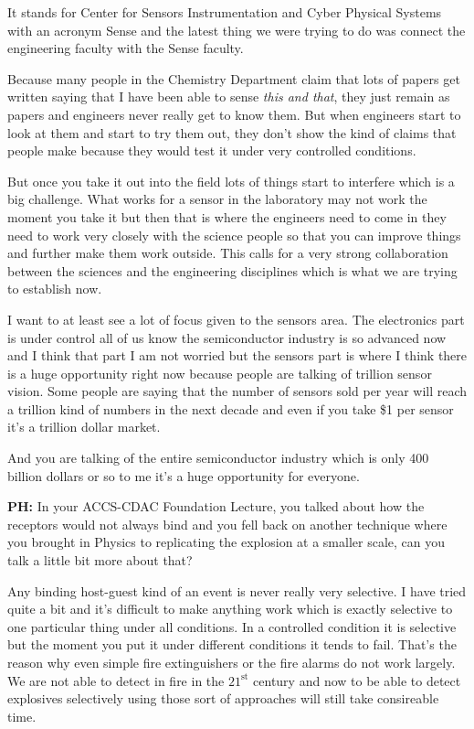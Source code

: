 \begin{multicols}{2}
It stands for Center for Sensors Instrumentation and Cyber Physical Systems with an acronym Sense and the latest thing we were trying to do was connect the engineering faculty with the Sense faculty.

Because many people in the Chemistry Department claim that lots of papers get written saying that I have been able to sense \textit{this and that}, they just remain as papers and engineers never really get to know them. But when engineers start to look at them and start to try them out, they don’t show the kind of claims that people make because they would test it under very controlled conditions.

But once you take it out into the field lots of things start to interfere which is a big challenge. What works for a sensor in the laboratory may not work the moment you take it but then that is where the engineers need to come in they need to work very closely with the science people so that you can improve things and further make them work outside. This calls for a very strong collaboration between the sciences and the engineering disciplines which is what we are trying to establish now.

I want to at least see a lot of focus given to the sensors area. The electronics part is under control all of us know the semiconductor industry is so advanced now and I think that part I am not worried but the sensors part is where I think there is a huge opportunity right now because people are talking of trillion sensor vision. Some people are saying that the number of sensors sold per year will reach a trillion kind of numbers in the next decade and even if you take \$1 per sensor it’s a trillion dollar market.

And you are talking of the entire semiconductor industry which is only 400 billion dollars or so to me it’s a huge opportunity for everyone.

\textbf{PH:} In your ACCS-CDAC Foundation Lecture, you talked about how the receptors would not always bind and you fell back on another technique where you brought in Physics to replicating the explosion at a smaller scale, can you talk a little bit more about that?

 Any binding host-guest kind of an event is never really very selective. I have tried quite a bit and it’s difficult to make anything work which is exactly selective to one particular thing under all conditions. In a controlled condition it is selective but the moment you put it under different conditions it tends to fail. That’s the reason why even simple fire extinguishers or the fire alarms do not work largely. We are not able to detect in fire in the $21^{\text{st}}$ century and now to be able to detect explosives selectively using those sort of approaches will still take consireable time.


\end{multicols}
